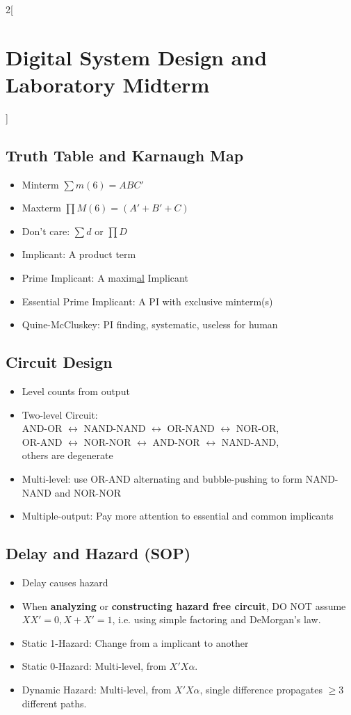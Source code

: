 \documentclass[12pt,a4paper,twoside]{article}
\begin{document}
\begin{multicols}{2}[\section*{Digital System Design and Laboratory Midterm}]
		\subsection*{Truth Table and Karnaugh Map}
		\begin{itemize}
			\item Minterm $\sum m (6) = ABC'$
			\item Maxterm $\prod M (6) = (A' + B' + C)$
			\item Don't care: $\sum d$ or $\prod D$
			\item Implicant: A product term
			\item Prime Implicant: A maxim\underline{al} Implicant
			\item Essential Prime Implicant: A PI with exclusive minterm(s)
			\item Quine-McCluskey: PI finding, systematic, useless for human
		\end{itemize}
		\subsection*{Circuit Design}
		\begin{itemize}
			\item Level counts from output
			\item Two-level Circuit: \\
			AND-OR $\leftrightarrow$ NAND-NAND $\leftrightarrow$ OR-NAND $\leftrightarrow$ NOR-OR, \\
			OR-AND $\leftrightarrow$ NOR-NOR $\leftrightarrow$ AND-NOR $\leftrightarrow$ NAND-AND, \\
			others are degenerate
			\item Multi-level: use OR-AND alternating and bubble-pushing to form NAND-NAND and NOR-NOR 
			\item Multiple-output: Pay more attention to essential and common implicants
		\end{itemize}
		\subsection*{Delay and Hazard (SOP)}
		\begin{itemize}
			\item Delay causes hazard
			\item When \textbf{analyzing} or \textbf{constructing hazard free circuit}, DO NOT assume $XX' = 0, X + X' = 1$, i.e. using simple factoring and DeMorgan's law.
			\item Static 1-Hazard: Change from a implicant to another
			\item Static 0-Hazard: Multi-level, from $X'X\alpha$.
			\item Dynamic Hazard: Multi-level, from $X'X\alpha$, single difference propagates $\geq 3$ different paths.
		\end{itemize}
	\end{multicols}
\end{document}
